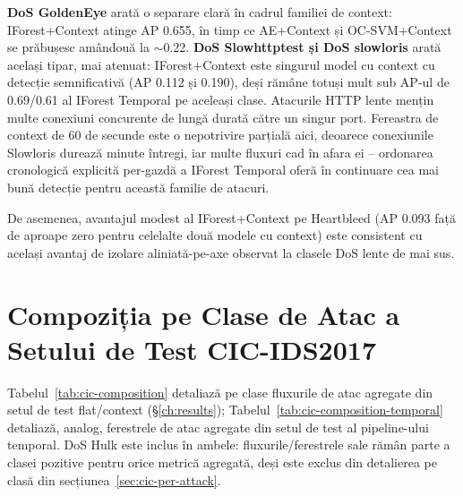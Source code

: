 \textbf{DoS GoldenEye} arată o separare clară în cadrul familiei de context: IForest+Context atinge AP 0.655, în timp ce AE+Context și OC-SVM+Context se prăbușesc amândouă la $\sim$0.22.
\textbf{DoS Slowhttptest și DoS slowloris} arată același tipar, mai atenuat: IForest+Context este singurul model cu context cu detecție semnificativă (AP 0.112 și 0.190), deși rămâne totuși mult sub AP-ul de 0.69/0.61 al IForest Temporal pe aceleași clase. Atacurile HTTP lente mențin multe conexiuni concurente de lungă durată către un singur port. Fereastra de context de 60 de secunde este o nepotrivire parțială aici, deoarece conexiunile Slowloris durează minute întregi, iar multe fluxuri cad în afara ei -- ordonarea cronologică explicită per-gazdă a IForest Temporal oferă în continuare cea mai bună detecție pentru această familie de atacuri.

De asemenea, avantajul modest al IForest+Context pe Heartbleed (AP 0.093 față de aproape zero pentru celelalte două modele cu context) este consistent cu același avantaj de izolare aliniată-pe-axe observat la clasele DoS lente de mai sus.

\chapter{Compoziția pe Clase de Atac a Setului de Test CIC-IDS2017}
\label{ch:cic-composition-temporal}

Tabelul~\ref{tab:cic-composition} detaliază pe clase fluxurile de atac agregate din setul de test flat/context (\S\ref{ch:results}); Tabelul~\ref{tab:cic-composition-temporal} detaliază, analog, ferestrele de atac agregate din setul de test al pipeline-ului temporal. DoS Hulk este inclus în ambele: fluxurile/ferestrele sale rămân parte a clasei pozitive pentru orice metrică agregată, deși este exclus din detalierea pe clasă din secțiunea~\ref{sec:cic-per-attack}.


